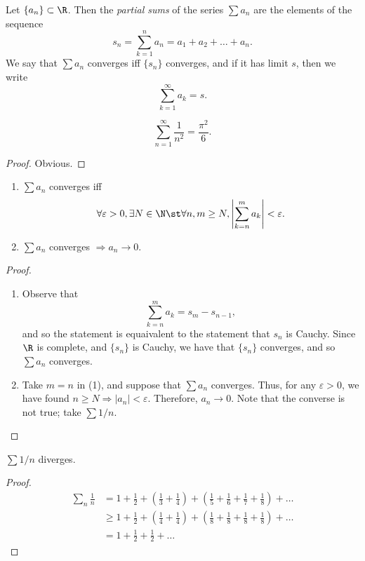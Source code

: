 \documentclass{notes}
\begin{document}
\begin{defn}
  Let $\{a_n\} \subset \R$. Then the \emph{partial sums} of the series $\sum a_n$ are the elements of
  the sequence $$s_n = \sum_{k=1}^n a_n = a_1 + a_2 + \dots + a_n.$$ We say that $\sum a_n$ converges
  iff $\{s_n\}$ converges, and if it has limit $s$, then we write $$\sum_{k=1}^\infty a_k = s.$$
\end{defn}

\begin{proposition}
  $$\sum_{n=1}^\infty \frac{1}{n^2} = \frac{\pi^2}{6}.$$ 
\end{proposition}
\begin{proof}
  Obvious.
\end{proof}

\begin{proposition}\leavevmode
  \begin{enumerate}
    \item $\sum a_n$ converges iff $$\forall \varepsilon > 0, \exists N\in\N \st \forall n,m \geq N,
      \left| \sum_{k=n}^m a_k \right| < \varepsilon.$$
    \item $\sum a_n$ converges $\Rightarrow a_n \to 0$.
  \end{enumerate}
\end{proposition}
\begin{proof}\leavevmode
  \begin{enumerate}
    \item Observe that $$\sum_{k=n}^m a_k = s_m - s_{n-1},$$ and so the statement is equaivalent to the 
      statement that $s_n$ is Cauchy. Since $\R$ is complete, and $\{s_n\}$ is Cauchy, we have that 
      $\{s_n\}$ converges, and so $\sum a_n$ converges.
    \item Take $m = n$ in (1), and suppose that $\sum a_n$ converges. Thus, for any $\varepsilon > 0$, 
      we have found $n \geq N \Rightarrow |a_n| < \varepsilon$. Therefore, $a_n \to 0$. Note that the 
      converse is not true; take $\sum 1/n$.
  \end{enumerate}
\end{proof}

\begin{proposition}
  $\sum 1/n$ diverges.
\end{proposition}
\begin{proof}
  \begin{align*}
    \sum_n \frac{1}{n} &= 1 + \frac{1}{2} + \left( \frac{1}{3} + \frac{1}{4} \right) + \left( \frac{1}{5} + \frac{1}{6} + \frac{1}{7} + \frac{1}{8} \right) + \dots \\
                       &\geq 1 + \frac{1}{2} + \left( \frac{1}{4} + \frac{1}{4} \right) + \left( \frac{1}{8} + \frac{1}{8} + \frac{1}{8} + \frac{1}{8} \right) + \dots \\
                       &= 1 + \frac{1}{2} + \frac{1}{2} + \dots 
  \end{align*}
\end{proof}
\end{document}
